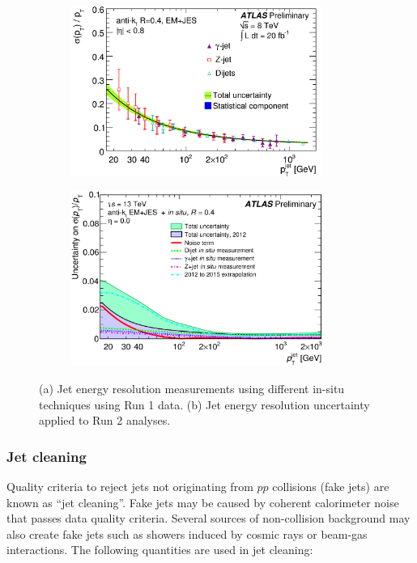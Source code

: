 \begin{figure}[h!]
\begin{subfigure}{0.5\textwidth}
  \centering
  \includegraphics[width=0.9\textwidth]{figures/Objects/jer2012.png}
  \caption{}
  \label{fig:obj:jet:jer2012}
\end{subfigure}
\begin{subfigure}{0.5\textwidth}
  \centering
  \includegraphics[width=0.9\textwidth]{figures/Objects/jeruncpt.png}
  \caption{}
  \label{fig:obj:jet:jerunc}
\end{subfigure}

\captionsetup{width=0.85\textwidth} \caption{\small (a) Jet energy resolution measurements using different in-situ techniques using Run 1 data. (b) Jet energy resolution uncertainty applied to Run 2 analyses.}
\label{fig:obj:jet:jer}
\end{figure}


\subsubsection{Jet cleaning}
\label{chp:obj:sec:jet:cleaning}
Quality criteria to reject jets not originating from $pp$ collisions (fake jets) are known as ``jet cleaning''.
Fake jets may be caused by coherent calorimeter noise that passes data quality criteria. Several sources of non-collision background may also create fake jets such as showers induced by cosmic rays or beam-gas interactions. The following quantities are used in jet cleaning:

